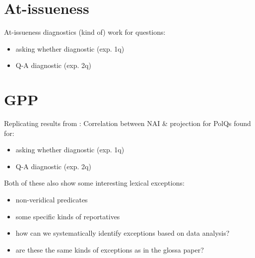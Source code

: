 \documentclass[11pt,fleqn]{article}
\newcommand{\6}{\mbox{$[\hspace*{-.6mm}[$}}
\newcommand{\9}{\mbox{$]\hspace*{-.6mm}]$}}
\begin{document}
\section{At-issueness}

At-issueness diagnostics (kind of) work for questions:
\begin{itemize}
  \item asking whether diagnostic (exp. 1q)
  \item Q-A diagnostic (exp. 2q)
\end{itemize}


\section{GPP}

Replicating results from \cite{tbd-variability}: Correlation between NAI \& projection for PolQs found for:
\begin{itemize}
  \item asking whether diagnostic (exp. 1q)
  \item Q-A diagnostic (exp. 2q)
\end{itemize}

\noindent Both of these also show some interesting lexical exceptions:
\begin{itemize}
  \item non-veridical predicates
  \item some specific kinds of reportatives
  \item how can we systematically identify exceptions based on data analysis?
  \item are these the same kinds of exceptions as in the glossa paper?
\end{itemize}
\end{document}
